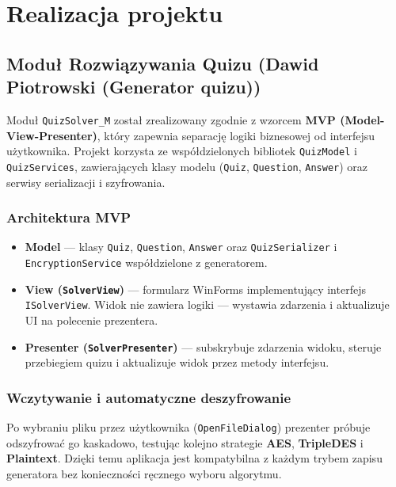 \documentclass[12pt,a4paper]{article}
\def\authorA{Dawid Piotrowski (Generator quizu)}
\begin{document}
\section{Realizacja projektu}

\subsection{Moduł Rozwiązywania Quizu (\authorA)}

Moduł \texttt{QuizSolver\_M} został zrealizowany zgodnie z wzorcem \textbf{MVP (Model-View-Presenter)},
który zapewnia separację logiki biznesowej od interfejsu użytkownika.
Projekt korzysta ze współdzielonych bibliotek \texttt{QuizModel} i \texttt{QuizServices},
zawierających klasy modelu (\texttt{Quiz}, \texttt{Question}, \texttt{Answer})
oraz serwisy serializacji i szyfrowania.

\subsubsection{Architektura MVP}

\begin{itemize}
    \item \textbf{Model} --- klasy \texttt{Quiz}, \texttt{Question}, \texttt{Answer}
          oraz \texttt{QuizSerializer} i \texttt{EncryptionService} współdzielone z generatorem.
    \item \textbf{View (\texttt{SolverView})} --- formularz WinForms implementujący interfejs
          \texttt{ISolverView}. Widok nie zawiera logiki --- wystawia zdarzenia i aktualizuje UI
          na polecenie prezentera.
    \item \textbf{Presenter (\texttt{SolverPresenter})} --- subskrybuje zdarzenia widoku,
          steruje przebiegiem quizu i aktualizuje widok przez metody interfejsu.
\end{itemize}

\subsubsection{Wczytywanie i automatyczne deszyfrowanie}

Po wybraniu pliku przez użytkownika (\texttt{OpenFileDialog}) prezenter próbuje
odszyfrować go kaskadowo, testując kolejno strategie \textbf{AES}, \textbf{TripleDES}
i \textbf{Plaintext}. Dzięki temu aplikacja jest kompatybilna z każdym trybem zapisu
generatora bez konieczności ręcznego wyboru algorytmu.
\end{document}
